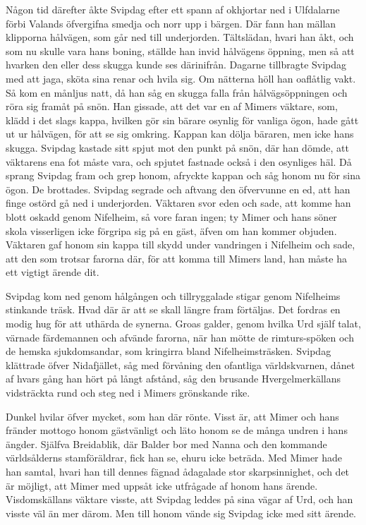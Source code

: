 Någon tid därefter åkte Svipdag efter ett spann af okhjortar ned i
Ulfdalarne förbi Valands öfvergifna smedja och norr upp i bärgen. Där
fann han mällan klipporna hålvägen, som går ned till underjorden.
Tältslädan, hvari han åkt, och som nu skulle vara hans boning, ställde
han invid hålvägens öppning, men så att hvarken den eller dess skugga
kunde ses därinifrån. Dagarne tillbragte Svipdag med att jaga, sköta
sina renar och hvila sig. Om nätterna höll han oaflåtlig vakt. Så kom en
månljus natt, då han såg en skugga falla från hålvägsöppningen och röra
sig framåt på snön. Han gissade, att det var en af Mimers väktare, som,
klädd i det slags kappa, hvilken gör sin bärare osynlig för vanliga
ögon, hade gått ut ur hålvägen, för att se sig omkring. Kappan kan dölja
bäraren, men icke hans skugga. Svipdag kastade sitt spjut mot den punkt
på snön, där han dömde, att väktarens ena fot måste vara, och spjutet
fastnade också i den osynliges häl.
\protect\hypertarget{lb1625905.xhtmlux5cux23start120}{}{}\protect\hypertarget{lb1625905.xhtmlux5cux23start120-a}{}{}\protect\hypertarget{lb1625905.xhtmlux5cux23start120-b}{}{}\protect\hypertarget{lb1625905.xhtmlux5cux23start120-c}{}{}\protect\hypertarget{lb1625905.xhtmlux5cux23start120-d}{}{}
Då sprang Svipdag fram och grep honom, afryckte kappan och såg honom nu
för sina ögon. De brottades. Svipdag segrade och aftvang den öfvervunne
en ed, att han finge ostörd gå ned i underjorden. Väktaren svor eden och
sade, att komme han blott oskadd genom Nifelheim, så vore faran ingen;
ty Mimer och hans söner skola visserligen icke förgripa sig på en gäst,
äfven om han kommer objuden. Väktaren gaf honom sin kappa till skydd
under vandringen i Nifelheim och sade, att den som trotsar farorna där,
för att komma till Mimers land, han måste ha ett vigtigt ärende dit.

Svipdag kom ned genom hålgången och tillryggalade stigar genom
Nifelheims stinkande träsk. Hvad där är att se skall längre fram
förtäljas. Det fordras en modig hug för att uthärda de synerna. Groas
galder, genom hvilka Urd själf talat, värnade färdemannen och afvände
farorna, när han mötte de rimturs-spöken och de hemska sjukdomsandar,
som kringirra bland Nifelheimsträsken. Svipdag klättrade öfver
Nidafjället, såg med förvåning den ofantliga världskvarnen, dånet af
hvars gång han hört på långt afstånd, såg den brusande Hvergelmerkällans
vidsträckta rund och steg ned i Mimers grönskande rike.

Dunkel hvilar öfver mycket, som han där rönte. Visst är, att Mimer och
hans fränder mottogo honom gästvänligt och läto honom se de många undren
i hans ängder. Själfva Breidablik, där Balder bor med Nanna och den
kommande världsålderns stamföräldrar, fick han se, ehuru icke beträda.
Med Mimer hade han samtal, hvari han till dennes fägnad ådagalade stor
skarpsinnighet, och det är möjligt, att Mimer med uppsåt icke utfrågade
af honom hans ärende. Visdomskällans väktare visste, att Svipdag leddes
på sina vägar af Urd, och han visste väl än mer därom. Men till honom
vände sig Svipdag icke med sitt ärende.

